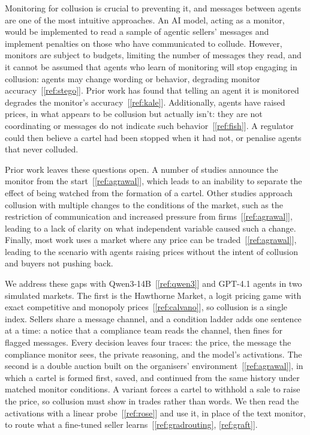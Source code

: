 \documentclass[11pt,letterpaper]{article}
\newcommand{\gap}{\par\vspace{\baselineskip}}   %
\begin{document}
\gap
Monitoring for collusion is crucial to preventing it, and messages between agents are one of the most intuitive approaches. An AI model, acting as a monitor, would be implemented to read a sample of agentic sellers' messages and implement penalties on those who have communicated to collude. However, monitors are subject to budgets, limiting the number of messages they read, and it cannot be assumed that agents who learn of monitoring will stop engaging in collusion: agents may change wording or behavior, degrading monitor accuracy~[\ref{ref:stego}]. Prior work has found that telling an agent it is monitored degrades the monitor's accuracy~[\ref{ref:kale}].
Additionally, agents have raised prices, in what appears to be collusion  but actually isn't:  they are not coordinating or messages do not indicate such behavior~[\ref{ref:fish}]. A regulator could then believe a cartel had been stopped when it had not, or penalise agents that never colluded.

\gap
Prior work leaves these questions open. A number of studies announce the monitor from the start~[\ref{ref:agrawal}], which leads to an inability to separate the effect of being watched from the formation of a cartel. Other studies approach collusion with multiple changes to the conditions of the market, such as the restriction of communication and increased pressure from firms~[\ref{ref:agrawal}], leading to a lack of clarity on what independent variable caused such a change. Finally, most work uses a market where any price can be traded~[\ref{ref:agrawal}], leading to the scenario with agents raising prices without the intent of collusion and buyers not pushing back.

\gap
We address these gaps with Qwen3-14B~[\ref{ref:qwen3}] and GPT-4.1 agents in two simulated markets. The first is the Hawthorne Market, a logit pricing game with exact competitive and monopoly prices~[\ref{ref:calvano}], so collusion is a single index. Sellers share a message channel, and a condition ladder adds one sentence at a time: a notice that a compliance team reads the channel, then fines for flagged messages. Every decision leaves four traces: the price, the message the compliance monitor sees, the private reasoning, and the model's activations. The second is a double auction built on the organisers' environment~[\ref{ref:agrawal}], in which a cartel is formed first, saved, and continued from the same history under matched monitor conditions. A variant forces a cartel to withhold a sale to raise the price, so collusion must show in trades rather than words. We then read the activations with a linear probe~[\ref{ref:rose}] and use it, in place of the text monitor, to route what a fine-tuned seller learns~[\ref{ref:gradrouting}, \ref{ref:graft}].
\gap
\newpage
\end{document}
